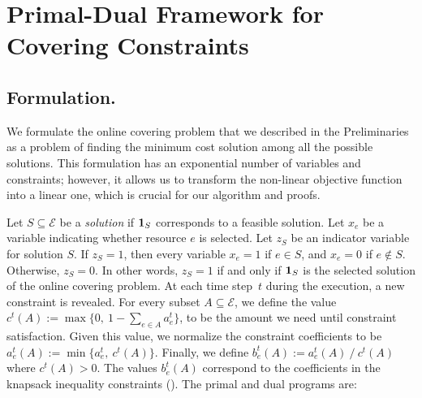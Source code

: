 
\section{Primal-Dual Framework for  Covering Constraints}		\label{sec:covering}

\subsection{Formulation.}
We formulate the online covering problem that we described in the Preliminaries as a problem of finding the minimum cost solution among all the possible solutions. This formulation has an exponential number of variables and constraints; however, it allows us to transform the non-linear objective function into a linear one, which is crucial for our algorithm and proofs.

Let $S \subseteq \mathcal{E}$ be a \emph{solution} if $\mathbf{1}_{S}$ corresponds to a feasible solution. Let $x_{e}$ be a variable indicating whether resource $e$ is selected.
Let $z_{S}$ be an indicator variable for solution $S$. If $z_{S} = 1$, then every variable
$x_{e} = 1$ if $e \in S$, and $x_{e} = 0$ if $e \notin S$. Otherwise, $z_S = 0$. In other words, $z_{S} = 1$ if and only if $\mathbf{1}_{S}$ is the selected solution of the online covering problem. At each time step~$t$ during the execution, a new constraint is revealed. For every subset $A \subseteq \mathcal{E}$, we define the value $c^{t}(A) := \max\{0,\ 1 - \sum_{e \in A} a^{t}_{e}\}$, to be the amount we need until constraint satisfaction. Given this value, we normalize the constraint coefficients to be $a^{t}_{e}(A) := \min\{a_{e}^{t},\ c^{t}(A)\}$. Finally, we define $b^{t}_{e}(A) := a^{t}_{e}(A)\ /\ c^{t}(A)$ where $c^{t}(A) > 0$. The values $b^{t}_{e}(A)$ correspond to the coefficients in the knapsack inequality constraints (\cite{CarrFleischer:2000}). The primal and dual programs are:

